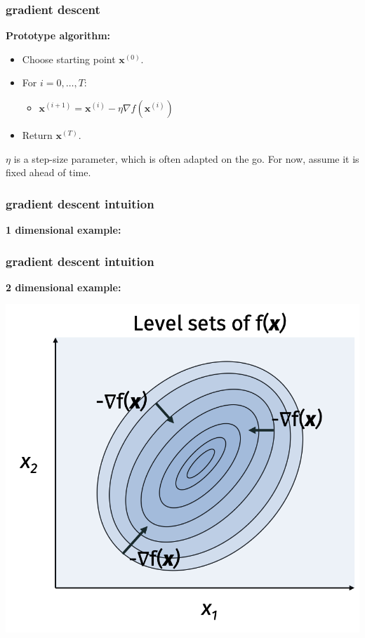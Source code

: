\documentclass[compress]{beamer}
\newcommand{\bv}[1]{\mathbf{#1}}
\begin{document}
\begin{frame}
	\frametitle{gradient descent}
	\textbf{Prototype algorithm:}
	\begin{itemize}
		\item Choose starting point $\bv{x}^{(0)}$.
		\item For $i = 0,\ldots, T$:
		\begin{itemize}
			\item $\bv{x}^{(i+1)} = \bv{x}^{(i)} - \eta \nabla f(\bv{x}^{(i)})$
		\end{itemize}
		\item Return $\bv{x}^{(T)}$.
	\end{itemize}
	
	$\eta$ is a step-size parameter, which is often adapted on the go. For now, assume it is fixed ahead of time.
\end{frame}

\begin{frame}[t]
	\frametitle{gradient descent intuition}
	\textbf{1 dimensional example:}
\end{frame}

\begin{frame}[t]
	\frametitle{gradient descent intuition}
	\textbf{2 dimensional example:}
	\begin{center}
		\includegraphics[width=.7\textwidth]{2d_example.png}
	\end{center}
\end{frame}
\end{document}
